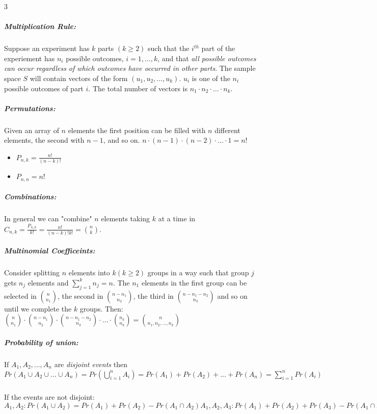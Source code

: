 \documentclass[landscape,10pt]{article}
\begin{document}
\begin{multicols}{3}
        \subparagraph*{Multiplication Rule: } 
            Suppose an experiment has $k$ parts \((k \geq 2)\) such that the $i^{th}$ part of the experiement has $n_i$ possible outcomes, $i = 1, \ldots, k$, and that \textit{all possible outcomes can occur regardless of which outcomes have occurred in other parts}. The sample space $S$ will contain vectors of the form $(u_1, u_2, \ldots, u_k)$. $u_i$ is one of the $n_i$ possible outcomes of part $i$. The total number of vectors is $n_1 \cdot n_2 \cdot \ldots \cdot n_k$.
        
        \subparagraph*{Permutations: } 
            Given an array of $n$ elements the first position can be filled with $n$ different elements, the second with $n-1$, and so on. $n \cdot (n-1) \cdot (n-2) \cdot \ldots \cdot 1 = n!$

            \begin{itemize}
                \item[] \(P_{n,k} = \frac{n!}{(n-k)!}\)
                \item[] \(P_{n,n} = n!\)
            \end{itemize}

        \subparagraph*{Combinations: }
            In general we can "combine" $n$ elements taking $k$ at a time in \(C_{n,k} = \frac{P_{n,k}}{k!} = \frac{n!}{(n-k)!k!} = {n \choose k} \). 

        \subparagraph*{Multinomial Coefficeints: } 
            Consider splitting $n$ elements into $k (k \geq 2)$ groups in a way such that group $j$ gets $n_j$ elements and $\sum\limits_{j = 1}^{k}n_j = n$. The $n_1$ elements in the first group can be selected in ${n \choose n_1}$, the second in ${n-n_1 \choose n_2}$, the third in ${n-n_1-n_2 \choose n_3}$ and so on until we complete the $k$ groups. Then: ${n \choose n_1}\cdot{n-n_1 \choose n_2}\cdot{n-n_1-n_2 \choose n_3}\cdot \ldots \cdot{n_k \choose n_k} = {n \choose n_1, n_2, \ldots, n_k}$
        \subparagraph*{Probability of union:}
            If $A_1, A_2, \ldots, A_n$ are \textit{disjoint events} then 
            \(Pr(A_1 \cup A_2 \cup \ldots \cup A_n) 
            = Pr(\bigcup\limits_{i=1}^{n}A_i) 
            = Pr(A_1) + Pr(A_2) + \ldots + Pr(A_n) 
            = \sum\limits_{i=1}^{n}Pr(A_i) \)
        \subparagraph*{} 
            If the events are not disjoint: 
            \( A_1, A_2: Pr(A_1 \cup A_2) = Pr(A_1) + Pr(A_2) - Pr(A_1 \cap A_2) 
            A_1, A_2, A_3: Pr(A_1) + Pr(A_2) + Pr(A_3) - Pr(A_1 \cap A_2) - Pr(A_1 \cap A_3) - Pr(A_2 \cap A_3) + Pr(A_1 \cap A_2 \cap A_3)\)     
        

\end{multicols}
\end{document}
